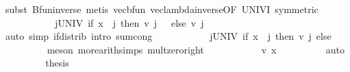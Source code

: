 \begin{isabellebody}
\ {\isacharparenleft}{\kern0pt}subst\ Bfun{\isacharunderscore}{\kern0pt}inverse{\isacharparenright}{\kern0pt}\ {\isacharparenleft}{\kern0pt}metis\ vec{\isacharunderscore}{\kern0pt}bfun\ vec{\isacharunderscore}{\kern0pt}lambda{\isacharunderscore}{\kern0pt}inverse{\isacharbrackleft}{\kern0pt}OF\ UNIV{\isacharunderscore}{\kern0pt}I{\isacharcomma}{\kern0pt}\ symmetric{\isacharbrackright}{\kern0pt}{\isacharparenright}{\kern0pt}{\isacharplus}{\kern0pt}\isanewline
\ \ \ \ \ \ \isamarkupfalse%
\ \isamarkupfalse%
\ {\isachardoublequoteopen}{\isasymdots}\ {\isacharequal}{\kern0pt}\ {\isacharparenleft}{\kern0pt}{\isasymSum}j{\isasymin}UNIV{\isachardot}{\kern0pt}\ {\isacharparenleft}{\kern0pt}{\isacharparenleft}{\kern0pt}if\ x\ {\isacharequal}{\kern0pt}\ j\ then\ v\ j\ {\isacharasterisk}{\kern0pt}\ {}\ else\ v\ j\ {\isacharasterisk}{\kern0pt}\ {}{\isacharparenright}{\kern0pt}{\isacharparenright}{\kern0pt}{\isacharparenright}{\kern0pt}{\isachardoublequoteclose}\isanewline
\ \ \ \ \ \ \ \ \isamarkupfalse%
\ {\isacharparenleft}{\kern0pt}auto\ simp{\isacharcolon}{\kern0pt}\ if{\isacharunderscore}{\kern0pt}distrib\ intro{\isacharbang}{\kern0pt}{\isacharcolon}{\kern0pt}\ sum{\isachardot}{\kern0pt}cong{\isacharparenright}{\kern0pt}\isanewline
\ \ \ \ \ \ \isamarkupfalse%
\ \isamarkupfalse%
\ {\isachardoublequoteopen}{\isasymdots}\ {\isacharequal}{\kern0pt}\ {\isacharparenleft}{\kern0pt}{\isasymSum}j{\isasymin}UNIV{\isachardot}{\kern0pt}\ {\isacharparenleft}{\kern0pt}{\isacharparenleft}{\kern0pt}if\ x\ {\isacharequal}{\kern0pt}\ j\ then\ v\ j\ else\ {}{\isacharparenright}{\kern0pt}{\isacharparenright}{\kern0pt}{\isacharparenright}{\kern0pt}{\isachardoublequoteclose}\isanewline
\ \ \ \ \ \ \ \ \isamarkupfalse%
\ {\isacharparenleft}{\kern0pt}meson\ more{\isacharunderscore}{\kern0pt}arith{\isacharunderscore}{\kern0pt}simps{\isacharparenleft}{\kern0pt}{}{\isacharparenright}{\kern0pt}\ mult{\isacharunderscore}{\kern0pt}zero{\isacharunderscore}{\kern0pt}right{\isacharparenright}{\kern0pt}\isanewline
\ \ \ \ \ \ \isamarkupfalse%
\ \isamarkupfalse%
\ {\isachardoublequoteopen}{\isasymdots}\ {\isacharequal}{\kern0pt}\ v\ x{\isachardoublequoteclose}\isanewline
\ \ \ \ \ \ \ \ \isamarkupfalse%
\ auto\isanewline
\ \ \ \ \ \ \isamarkupfalse%
\ \isamarkupfalse%
\ {\isacharquery}{\kern0pt}thesis\isacommand{{\isachardot}{\kern0pt}}\isamarkupfalse%
\isanewline
\ \ \ \ \isamarkupfalse%

\end{isabellebody}
